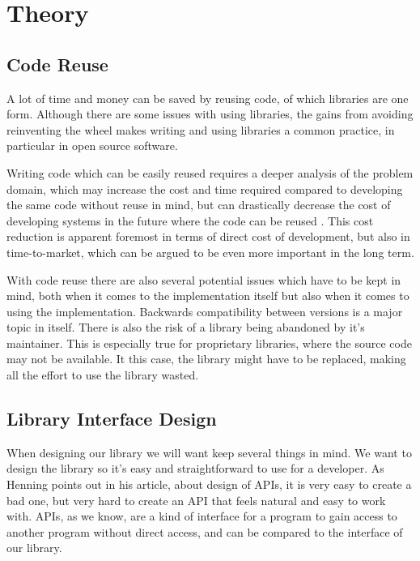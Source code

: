 \documentclass{sigchi-alternate}
\begin{document}
\section{Theory}
\subsection{Code Reuse}
A lot of time and money can be saved by reusing code, of which libraries are one form. Although there are
some issues with using libraries, the gains from avoiding reinventing the wheel makes writing and using
libraries a common practice, in particular in open source software\autocite{2998479020080101}.

Writing code which can be easily reused requires a deeper analysis of the problem domain, which may increase the cost and time required compared 
to developing the same code without reuse in mind, but can drastically decrease the cost of developing systems in the future where the code can 
be reused \autocite{lim1994effects}. This cost reduction is apparent foremost in terms of direct cost of development, but also in time-to-market, 
which can be argued to be even more important in the long term\autocite{griss1993software}.

With code reuse there are also several potential issues which have to be kept in mind, both when it comes to the implementation itself but also 
when it comes to using the implementation. Backwards compatibility between versions is a major topic in itself\autocite{raemaekers2012measuring}. There 
is also the risk of a library being abandoned by it’s maintainer. This is especially true for proprietary libraries, where the source code may not 
be available. It this case, the library might have to be replaced, making all the effort to use the library wasted.

\subsection{Library Interface Design}
When designing our library we will want keep several things in mind. We want to design the library so it’s easy and straightforward to use for a 
developer. As Henning points out in his article\autocite{Henning:2007:ADM:1255421.1255422}, about design of APIs, it is very easy to create a bad one, 
but very hard to create an API that feels natural and easy to work with. APIs, as we know, are a kind of interface for a program to gain access to 
another program without direct access, and can be compared to the interface of our library.
\end{document}
